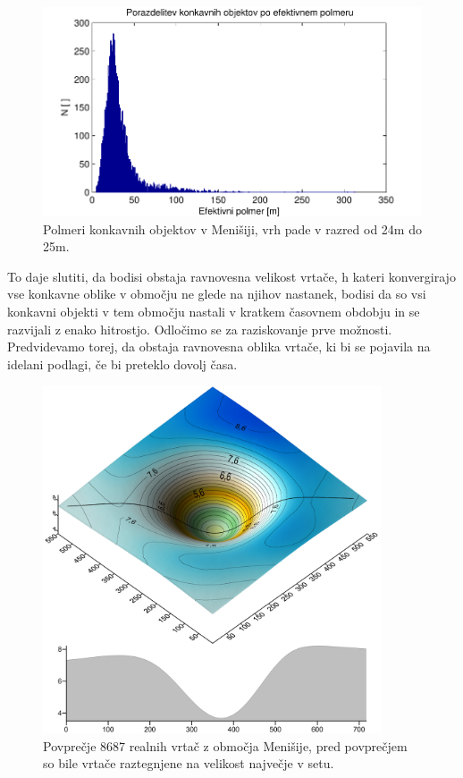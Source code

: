 \documentclass[a4paper, twoside, 12pt]{book}
\begin{document}
        \begin{figure}[h]
          \begin{center}
            \includegraphics[width=12cm]{slike/menisija-polmeri-hist}
          \end{center}
          \caption{Polmeri konkavnih objektov v Menišiji, vrh pade v razred od 24m do 25m.}
          \label{fig:menisija-polmeri-hist}
        \end{figure}

        To daje slutiti, da bodisi obstaja ravnovesna velikost vrtače, h kateri konvergirajo vse konkavne oblike v območju ne glede na njihov nastanek, bodisi da so vsi konkavni objekti v tem območju nastali v kratkem časovnem obdobju in se razvijali z enako hitrostjo. Odločimo se za raziskovanje prve možnosti.
        Predvidevamo torej, da obstaja ravnovesna oblika vrtače, ki bi se pojavila na idelani podlagi, če bi preteklo dovolj časa.

        \begin{figure}[h]
          \begin{center}
            \includegraphics[width=10cm]{slike/menisija-vrtaca}
          \end{center}
          \caption{Povprečje 8687 realnih vrtač z območja Menišije, pred povprečjem so bile vrtače raztegnjene na velikost največje v setu.}
          \label{fig:menisija-vrtaca}
        \end{figure}
\end{document}
